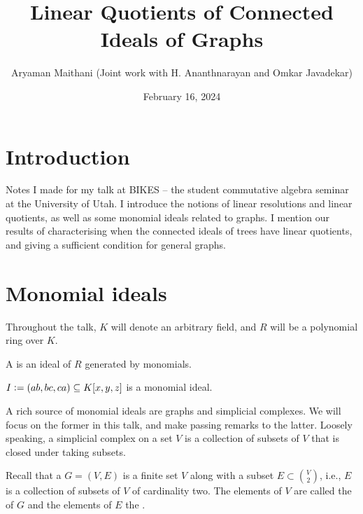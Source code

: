 \documentclass[12pt]{article}
\title{Linear Quotients of Connected Ideals of Graphs}
\author{Aryaman Maithani (Joint work with H. Ananthnarayan and Omkar Javadekar)}
\date{February 16, 2024}
\begin{document}
\maketitle

\section{Introduction}

Notes I made for my talk at BIKES -- the student commutative algebra seminar at the University of Utah. I introduce the notions of linear resolutions and linear quotients, as well as some monomial ideals related to graphs. I mention our results of characterising when the connected ideals of trees have linear quotients, and giving a sufficient condition for general graphs.

\section{Monomial ideals}

Throughout the talk, $K$ will denote an arbitrary field, and $R$ will be a polynomial ring over $K$.

\begin{defn}
	A  is an ideal of $R$ generated by monomials.
\end{defn}

\begin{ex}
	$I \vcentcolon= (ab, bc, ca) \subset K[x, y, z]$ is a monomial ideal.
\end{ex}

A rich source of monomial ideals are graphs and simplicial complexes. We will focus on the former in this talk, and make passing remarks to the latter. Loosely speaking, a simplicial complex on a set $V$ is a collection of subsets of $V$ that is closed under taking subsets. 

Recall that a  $G = (V, E)$ is a finite set $V$ along with a subset $E \subset \binom{V}{2}$, i.e., $E$ is a collection of subsets of $V$ of cardinality two. The elements of $V$ are called the  of $G$ and the elements of $E$ the .
\end{document}
